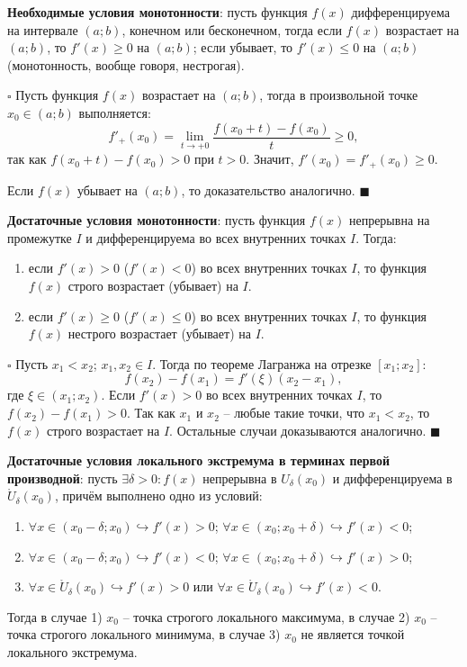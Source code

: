 \documentclass[12pt, a4paper, reqno]{article}
\begin{document}
    \textbf{Необходимые условия монотонности}: пусть функция $f(x)$ дифференцируема на интервале
    $(a; b)$, конечном или бесконечном, тогда если $f(x)$ возрастает на $(a; b)$, то $f'(x)\geq 0$
    на $(a; b)$; если убывает, то $f'(x)\leq 0$ на $(a; b)$ (монотонность, вообще говоря, нестрогая).

    $\square$ Пусть функция $f(x)$ возрастает на $(a; b)$, тогда в произвольной точке $x_0\in(a; b)$
    выполняется:
    \begin{equation*}
        f'_{+}(x_0) = \lim\limits_{t\to +0} \dfrac{f(x_0 + t) - f(x_0)}{t} \geq 0,
    \end{equation*}
    так как $f(x_0 + t) - f(x_0) > 0$ при $t > 0$. Значит, $f'(x_0) = f'_{+}(x_0) \geq 0$.

    Если $f(x)$ убывает на $(a; b)$, то доказательство аналогично. $\blacksquare$

    \textbf{Достаточные условия монотонности}: пусть функция $f(x)$ непрерывна на промежутке $I$ и
    дифференцируема во всех внутренних точках $I$. Тогда:
    \begin{enumerate}
        \item если $f'(x) > 0$ ($f'(x) < 0$) во всех внутренних точках $I$, то функция $f(x)$ строго
              возрастает (убывает) на $I$.
        \item если $f'(x) \geq 0$ ($f'(x) \leq 0$) во всех внутренних точках $I$, то функция $f(x)$
              нестрого возрастает (убывает) на $I$.
    \end{enumerate}

    $\square$ Пусть $x_1 < x_2$; $x_1, x_2\in I$. Тогда по теореме Лагранжа на отрезке $[x_1; x_2]$:
    \begin{equation*}
        f(x_2) - f(x_1) = f'(\xi)(x_2 - x_1),
    \end{equation*}
    где $\xi\in(x_1; x_2)$. Если $f'(x) > 0$ во всех внутренних точках $I$, то $f(x_2) - f(x_1) > 0$.
    Так как $x_1$ и $x_2$ -- любые такие точки, что $x_1 < x_2$, то $f(x)$ строго возрастает на $I$.
    Остальные случаи доказываются аналогично. $\blacksquare$

    \textbf{Достаточные условия локального экстремума в терминах первой производной}: пусть
    $\exists\delta > 0: f(x)$ непрерывна в $U_{\delta}(x_0)$ и дифференцируема в
    $\mathring U_{\delta}(x_0)$, причём выполнено одно из условий:
    \begin{enumerate}
        \item $\forall x\in(x_0 - \delta; x_0)\hookrightarrow f'(x) > 0$;
              $\forall x\in(x_0; x_0 + \delta)\hookrightarrow f'(x) < 0$;
        \item $\forall x\in(x_0 - \delta; x_0)\hookrightarrow f'(x) < 0$;
              $\forall x\in(x_0; x_0 + \delta)\hookrightarrow f'(x) > 0$;
        \item $\forall x\in\mathring U_{\delta}(x_0)\hookrightarrow f'(x) > 0$ или
              $\forall x\in\mathring U_{\delta}(x_0)\hookrightarrow f'(x) < 0$.
    \end{enumerate}
    Тогда в случае 1) $x_0$ -- точка строгого локального максимума, в случае 2) $x_0$ -- точка
    строгого локального минимума, в случае 3) $x_0$ не является точкой локального экстремума.
\end{document}
